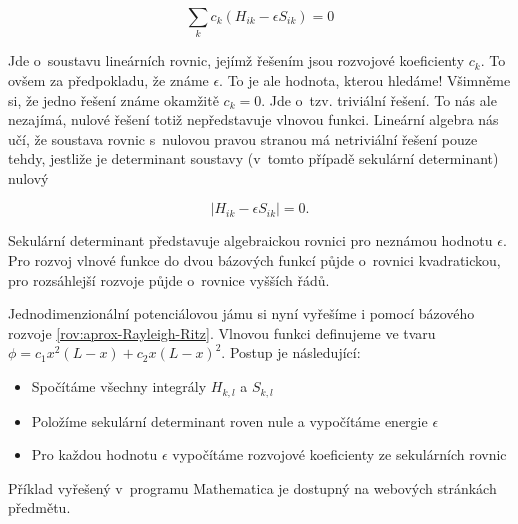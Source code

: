   \begin{equation}
 \sum_k c_{k}\left(H_{ik}-\epsilon S_{ik}\right)=0
     \end{equation}
 
Jde o~soustavu lineárních rovnic, jejímž řešením jsou rozvojové koeficienty $c_k$. To ovšem za předpokladu, že známe $\epsilon$. To je ale hodnota, kterou hledáme! Všimněme si, že jedno řešení známe okamžitě $c_k=0$. Jde o~tzv. triviální řešení. To nás ale nezajímá, nulové řešení totiž nepředstavuje vlnovou funkci. Lineární algebra nás učí, že soustava rovnic s~nulovou pravou stranou má netriviální řešení pouze tehdy, jestliže je determinant soustavy (v~tomto případě sekulární determinant) nulový
 
   \begin{equation}
 |H_{ik}-\epsilon S_{ik}|=0.
     \end{equation}
 
Sekulární determinant představuje algebraickou rovnici pro neznámou hodnotu $\epsilon$. Pro rozvoj  vlnové funkce do dvou bázových funkcí půjde o~rovnici kvadratickou, pro rozsáhlejší rozvoje půjde o~rovnice vyšších řádů.

\begin{priklad}
Jednodimenzionální potenciálovou jámu si nyní vyřešíme i pomocí bázového rozvoje \ref{rov:aprox-Rayleigh-Ritz}. Vlnovou funkci definujeme ve tvaru $ \phi=c_1x^2(L-x)+c_2x(L-x)^2 $. Postup je následující:

\begin{itemize}

\item Spočítáme všechny integrály $H_{k,l}$ a $S_{k,l}$
\item Položíme sekulární determinant roven nule a vypočítáme energie $\epsilon$
\item Pro každou hodnotu $\epsilon$ vypočítáme rozvojové koeficienty ze sekulárních rovnic

\end{itemize}

Příklad vyřešený v~programu Mathematica je dostupný na webových stránkách předmětu.

\end{priklad} 
 
